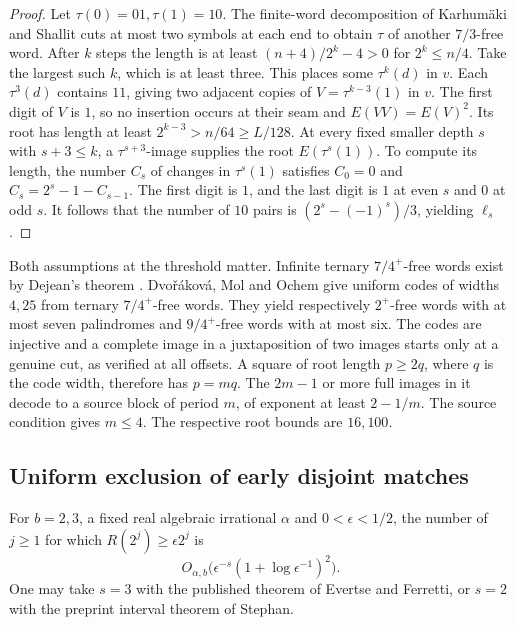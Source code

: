 \begin{proof}
Let \(\tau(0)=01,\tau(1)=10\). The finite-word decomposition of Karhum\"aki and Shallit \cite[Theorem~6]{KS} cuts at most two symbols at each end to obtain \(\tau\) of another \(7/3\)-free word. After \(k\) steps the length is at least \((n+4)/2^k-4>0\) for \(2^k\le n/4\). Take the largest such \(k\), which is at least three. This places some \(\tau^k(d)\) in \(v\). Each \(\tau^3(d)\) contains \(11\), giving two adjacent copies of \(V=\tau^{k-3}(1)\) in \(v\). The first digit of \(V\) is \(1\), so no insertion occurs at their seam and \(E(VV)=E(V)^2\). Its root has length at least \(2^{k-3}>n/64\ge L/128\). At every fixed smaller depth \(s\) with \(s+3\le k\), a \(\tau^{s+3}\)-image supplies the root \(E(\tau^s(1))\). To compute its length, the number \(C_s\) of changes in \(\tau^s(1)\) satisfies \(C_0=0\) and \(C_s=2^s-1-C_{s-1}\). The first digit is \(1\), and the last digit is \(1\) at even \(s\) and \(0\) at odd \(s\). It follows that the number of \(10\) pairs is \((2^s-(-1)^s)/3\), yielding \(\ell_s\).
\end{proof}

Both assumptions at the threshold matter. Infinite ternary \(7/4^+\)-free words exist by Dejean's theorem \cite{Dejean}. Dvo\v r\'akov\'a, Mol and Ochem \cite[Theorem~3(b),(c)]{DMO} give uniform codes of widths \(4,25\) from ternary \(7/4^+\)-free words. They yield respectively \(2^+\)-free words with at most seven palindromes and \(9/4^+\)-free words with at most six. The codes are injective and a complete image in a juxtaposition of two images starts only at a genuine cut, as verified at all offsets. A square of root length \(p\ge2q\), where \(q\) is the code width, therefore has \(p=mq\). The \(2m-1\) or more full images in it decode to a source block of period \(m\), of exponent at least \(2-1/m\). The source condition gives \(m\le4\). The respective root bounds are \(16,100\).

\subsection{Uniform exclusion of early disjoint matches}

\begin{proposition}\label{prop:dyadic-match}
For \(b=2,3\), a fixed real algebraic irrational \(\alpha\) and \(0<\epsilon<1/2\), the number of \(j\ge1\) for which \(R(2^j)\ge\epsilon 2^j\) is
\[
     O_{\alpha,b}\big(\epsilon^{-s}(1+\log\epsilon^{-1})^2\big).
\]
One may take \(s=3\) with the published theorem of Evertse and Ferretti, or \(s=2\) with the preprint interval theorem of Stephan.
\end{proposition}

